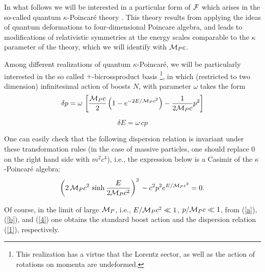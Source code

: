 \documentclass [11pt] {article}
\begin{document}
 In what follows we will be
interested in a particular form of ${\cal F}$ which arises in the so-called 
quantum $\kappa$-Poincar\'{e} theory \cite{lunoruto, maru, luruto, luruza}.
This theory  results from applying the ideas of quantum deformations to 
four-dimensional Poincare algebra, and leads to modifications of 
relativistic symmetries at the energy scales comparable to the $\kappa$ 
parameter of the theory, which we will identify with ${\cal M}_P c$. 



 Among different
realizations of quantum $\kappa$-Poincar\'{e}, we will be particularly
interested in the so called $+$-bicrossproduct basis \cite{maru, 
luruza}\footnote{This realization has a virtue that the Lorentz sector, as
well as the action of rotations on momenta are undeformed.}, in which 
(restricted to two dimension) infinitesimal action of boosts $N$, with 
parameter $\omega$ takes the form 
\begin{equation}\label{a}
 \delta p = \omega\,\left[\frac{{\cal M}_P c}{2} \left( 1 - e^{-2 E/{\cal M}_P
 c^2}\right) - \frac{1}{2{\cal M}_P c} p^2\right]
\end{equation}

\begin{equation}\label{b}
\delta E = \omega\, c p
\end{equation}

One can easily check that the following dispersion relation  is invariant 
under these transformation rules (in the case of massive particles, one 
should replace $0$ on  the right hand side with $m^2 c^4$), i.e., the 
expression below is a Casimir of the $\kappa$-Poincar\'{e} algebra: 
\begin{equation}\label{4}
 \left(2\,{\cal M}_P c^2\,\sinh \frac{E}{2{\cal M}_P
 c^2}\right)^2\,
  -c^2p^2 e^{E/{\cal M}_Pc^2} =0.
\end{equation}

 Of course, in the
 limit of large  ${\cal M}_P$, i.e., $E/{\cal M}_P c^2 \ll 1$,
 $p/{\cal M}_P c \ll 1$, from (\ref{a}), (\ref{b}), and (\ref{4}) one obtains the
 standard boost action and the dispersion relation (\ref{1}), respectively.
\end{document}
